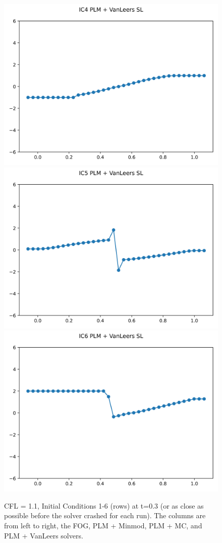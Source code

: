 \documentclass{article}
\begin{document}
\begin{figure}[t]
        \includegraphics[width=.95\textwidth]{../../code/unsafe_IC4Methodpv_plot.png}
        \includegraphics[width=.95\textwidth]{../../code/unsafe_IC5Methodpv_plot.png}
        \includegraphics[width=.95\textwidth]{../../code/unsafe_IC6Methodpv_plot.png}
    \emp
    \caption{CFL = 1.1, Initial Conditions 1-6 (rows) at t=0.3 (or as close as possible before the
    solver crashed for each run). The columns are from left to right, the FOG,
    PLM + Minmod, PLM + MC, and PLM + VanLeers solvers.}
    \label{fig:unsafe_sol_1_6}
\end{figure}
\end{document}
